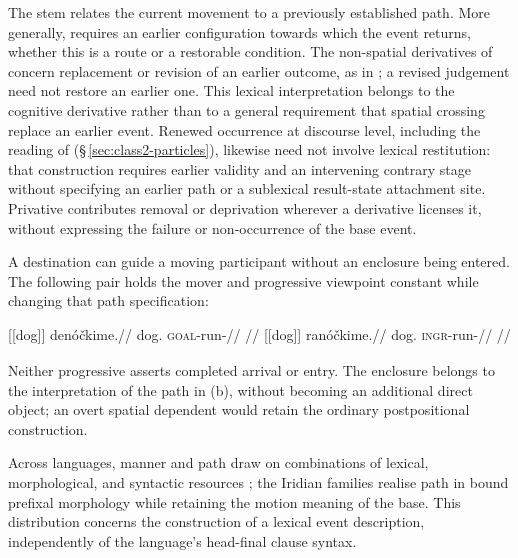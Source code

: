 The stem   relates the current
movement to a previously established path. More generally,  requires an
earlier configuration towards which the event returns, whether this is a route
or a restorable condition. The non-spatial derivatives of  concern
replacement or revision of an earlier outcome, as in ; a revised
judgement need not restore an earlier one. This lexical interpretation belongs
to the cognitive derivative rather than to a general requirement that spatial
crossing replace an earlier event. Renewed occurrence at discourse level, including the
reading of  (§\,\ref{sec:class2-particles}), likewise need not
involve lexical restitution: that construction requires earlier validity
and an intervening contrary stage without specifying an earlier path or a
sublexical result-state attachment site. Privative  contributes removal or
deprivation wherever a derivative licenses it, without expressing the failure
or non-occurrence of the base event.


A destination can guide a moving participant without an enclosure being
entered. The following pair holds the mover and progressive viewpoint
constant while changing that path specification:

\pex\label{ex:deriv-slot-path}
\a
\begingl
\gla \textnormal{[[dog]]}\textsubscript{\Dir{}} denóčkime.//
\glb dog.\Dir{} \textsc{goal}-run-\Prog{}//
\glft {}
//
\endgl
\a
\begingl
\gla \textnormal{[[dog]]}\textsubscript{\Dir{}} ranóčkime.//
\glb dog.\Dir{} \textsc{ingr}-run-\Prog{}//
\glft {}
//
\endgl
\xe

Neither progressive asserts completed arrival or entry. The enclosure
belongs to the interpretation of the path in (b), without becoming an
additional direct object; an overt spatial dependent would retain the
ordinary postpositional construction.

Across languages, manner and path draw on combinations of lexical,
morphological, and syntactic resources \cite[p.~331]{beaverslevintham2010};
the Iridian families realise path in bound prefixal morphology while retaining
the motion meaning of the base. This distribution concerns the construction of
a lexical event description, independently of the language's head-final
clause syntax.

